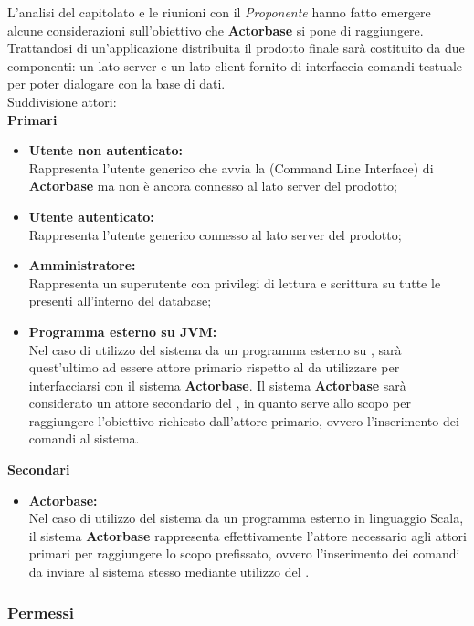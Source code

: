 \documentclass{scalatekids-article}
\begin{document}
L'analisi del capitolato e le riunioni con il \textit{Proponente} hanno fatto emergere alcune considerazioni sull'obiettivo che \textbf{Actorbase} si pone di raggiungere.\\Trattandosi di un'applicazione distribuita il prodotto finale sarà costituito da due  componenti: un lato server e un lato client fornito di interfaccia comandi testuale per poter dialogare con la base di dati.\\ Suddivisione attori:\\
\textbf{Primari}
\begin{itemize}
\item\textbf{Utente non autenticato:}\\
  Rappresenta l'utente generico che avvia la  (Command Line Interface) di \textbf{Actorbase} ma non è ancora connesso al lato server del prodotto;
\item\textbf{Utente autenticato:}\\
  Rappresenta l'utente generico connesso al lato server del prodotto;
\item\textbf{Amministratore:}\\
  Rappresenta un superutente con privilegi di lettura e scrittura su tutte le  presenti all'interno del database;
\item\textbf{Programma esterno su JVM:}\\
  Nel caso di utilizzo del sistema da un programma esterno su , sarà quest'ultimo ad essere attore primario rispetto al  da utilizzare per
  interfacciarsi con il sistema \textbf{Actorbase}. Il sistema \textbf{Actorbase} sarà considerato un attore secondario del , in quanto serve allo scopo
  per raggiungere l'obiettivo richiesto dall'attore primario, ovvero l'inserimento dei comandi al sistema.
\end{itemize}
\textbf{Secondari}
\begin{itemize}
\item\textbf{Actorbase:}\\
  Nel caso di utilizzo del sistema da un programma esterno in linguaggio Scala, il sistema \textbf{Actorbase} rappresenta effettivamente l'attore necessario agli attori primari per raggiungere
  lo scopo prefissato, ovvero l'inserimento dei comandi da inviare al sistema stesso mediante utilizzo del .
\end{itemize}

\subsubsection{Permessi}
\label{sec:permessi}
\end{document}

